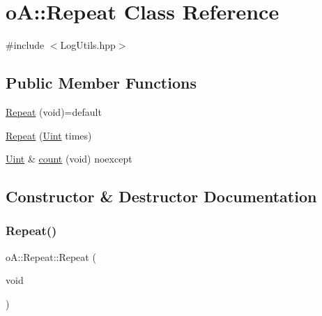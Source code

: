 \hypertarget{classo_a_1_1_repeat}{}\section{oA\+:\+:Repeat Class Reference}
\label{classo_a_1_1_repeat}


{\ttfamily \#include $<$Log\+Utils.\+hpp$>$}

\subsection*{Public Member Functions}
\begin{DoxyCompactItemize}
\item 
\mbox{\hyperlink{classo_a_1_1_repeat_a2ec587ad895e56ef3c22061a819f4f45}{Repeat}} (void)=default
\item 
\mbox{\hyperlink{classo_a_1_1_repeat_acced7bf3a3daff1434569dc593e2de0e}{Repeat}} (\mbox{\hyperlink{namespaceo_a_abe1d8250226c5cf34f84d7b75fc7922e}{Uint}} times)
\item 
\mbox{\hyperlink{namespaceo_a_abe1d8250226c5cf34f84d7b75fc7922e}{Uint}} \& \mbox{\hyperlink{classo_a_1_1_repeat_aae1cd1f736329d24bebd70a050aec29c}{count}} (void) noexcept
\end{DoxyCompactItemize}


\subsection{Constructor \& Destructor Documentation}
\mbox{\label{classo_a_1_1_repeat_a2ec587ad895e56ef3c22061a819f4f45}} 
\subsubsection{\texorpdfstring{Repeat()}{Repeat()}\hspace{0.1cm}{\footnotesize\ttfamily [1/2]}}
{\footnotesize\ttfamily o\+A\+::\+Repeat\+::\+Repeat (\begin{DoxyParamCaption}\item[{void}]{ }\end{DoxyParamCaption})\hspace{0.3cm}{\ttfamily [default]}}

\mbox{\label{classo_a_1_1_repeat_acced7bf3a3daff1434569dc593e2de0e}} 
